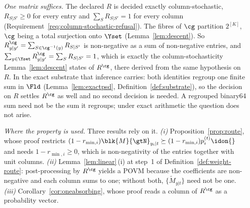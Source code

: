 \begin{remark}\label{rem:colstoch}
\emph{One matrix suffices.} The declared $R$ is decided exactly
column-stochastic, $R_{S|S'}\ge0$ for every entry and $\sum_SR_{S|S'}=1$ for
every column (Requirement~\ref{req:column-stochastic-refusal}). The fibres of
$\cg$ partition $2^{[K]}$, $\cg$ being a total surjection onto $\Yset$
(Lemma~\ref{lem:descent}). So
$R^{\cg}_{y|y'}=\sum_{S\in\cg^{-1}(y)}R_{S|S'}$ is non-negative as a sum of
non-negative entries, and
$\sum_{y\in\Yset}R^{\cg}_{y|y'}=\sum_{S}R_{S|S'}=1$, which is exactly the
column-stochasticity Lemma~\ref{lem:descent} states of $R^{\cg}$, there
derived from the same hypothesis on $R$. In the exact substrate that inference
carries: both identities regroup one finite sum in $\Fld$
(Lemma~\ref{lem:exactpsd}, Definition~\ref{def:substrate}), so the decision on
$R$ settles $R^{\cg}$ as well and no second decision is needed. A regrouped
binary64 sum need not be the sum it regroups; under exact arithmetic the
question does not arise.

\emph{Where the property is used.} Three results rely on it.
\emph{(i)} Proposition~\ref{prop:route}, whose proof restricts
$(1-r_{\min,i})\blk{M}{\gtN}_{y_i|t}\succeq(1-r_{\min,i})p^{(t)}_i\idon{}$ and
needs $1-r_{\min,i}\ge0$, which is non-negativity of the entries together with
unit columns. \emph{(ii)} Lemma~\ref{lem:linear}\,(i) at step~1 of
Definition~\ref{def:weight-route}: post-processing by $R^{\cg}$ yields a POVM
because the coefficients are non-negative and each column sums to one; without
both, $\{\widetilde M_{y|t}\}$ need not be one. \emph{(iii)}
Corollary~\ref{cor:oneabsorbing}, whose proof reads a column of $R^{\cg}$ as a
probability vector.


\end{remark}
